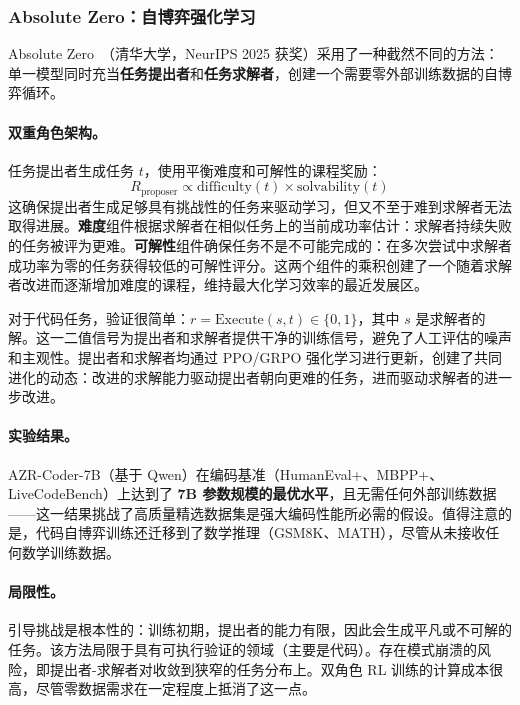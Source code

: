 \subsubsection{Absolute Zero：自博弈强化学习}

Absolute Zero~\citep{absolutezero2025}（清华大学，NeurIPS 2025 获奖）采用了一种截然不同的方法：单一模型同时充当\textbf{任务提出者}和\textbf{任务求解者}，创建一个需要零外部训练数据的自博弈循环。

\paragraph{双重角色架构。}
任务提出者生成任务 $t$，使用平衡难度和可解性的课程奖励：
\begin{equation}
R_{\text{proposer}} \propto \text{difficulty}(t) \times \text{solvability}(t)
\end{equation}
这确保提出者生成足够具有挑战性的任务来驱动学习，但又不至于难到求解者无法取得进展。\textbf{难度}组件根据求解者在相似任务上的当前成功率估计：求解者持续失败的任务被评为更难。\textbf{可解性}组件确保任务不是不可能完成的：在多次尝试中求解者成功率为零的任务获得较低的可解性评分。这两个组件的乘积创建了一个随着求解者改进而逐渐增加难度的课程，维持最大化学习效率的最近发展区。

对于代码任务，验证很简单：$r = \text{Execute}(s, t) \in \{0, 1\}$，其中 $s$ 是求解者的解。这一二值信号为提出者和求解者提供干净的训练信号，避免了人工评估的噪声和主观性。提出者和求解者均通过 PPO/GRPO 强化学习进行更新，创建了共同进化的动态：改进的求解能力驱动提出者朝向更难的任务，进而驱动求解者的进一步改进。

\paragraph{实验结果。}
AZR-Coder-7B（基于 Qwen）在编码基准（HumanEval+、MBPP+、LiveCodeBench）上达到了 \textbf{7B 参数规模的最优水平}，且无需任何外部训练数据——这一结果挑战了高质量精选数据集是强大编码性能所必需的假设。值得注意的是，代码自博弈训练还迁移到了数学推理（GSM8K、MATH），尽管从未接收任何数学训练数据。

\paragraph{局限性。}
引导挑战是根本性的：训练初期，提出者的能力有限，因此会生成平凡或不可解的任务。该方法局限于具有可执行验证的领域（主要是代码）。存在模式崩溃的风险，即提出者-求解者对收敛到狭窄的任务分布上。双角色 RL 训练的计算成本很高，尽管零数据需求在一定程度上抵消了这一点。


